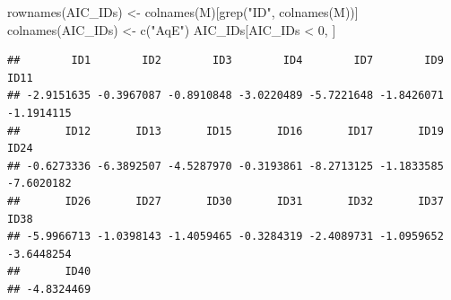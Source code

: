 \documentclass[
  ignorenonframetext,
]{beamer}
\newenvironment{Shaded}{\begin{snugshade}}{\end{snugshade}}
\newcommand{\DecValTok}[1]{\textcolor[rgb]{0.00,0.00,0.81}{#1}}
\newcommand{\FunctionTok}[1]{\textcolor[rgb]{0.00,0.00,0.00}{#1}}
\newcommand{\NormalTok}[1]{#1}
\newcommand{\OtherTok}[1]{\textcolor[rgb]{0.56,0.35,0.01}{#1}}
\newcommand{\SpecialCharTok}[1]{\textcolor[rgb]{0.00,0.00,0.00}{#1}}
\newcommand{\StringTok}[1]{\textcolor[rgb]{0.31,0.60,0.02}{#1}}
\begin{document}
\begin{frame}[fragile]{}
\protect\hypertarget{section-19}{}
\tiny

\begin{Shaded}
\begin{Highlighting}[]
\FunctionTok{rownames}\NormalTok{(AIC\_IDs) }\OtherTok{\textless{}{-}} \FunctionTok{colnames}\NormalTok{(M)[}\FunctionTok{grep}\NormalTok{(}\StringTok{"ID"}\NormalTok{, }\FunctionTok{colnames}\NormalTok{(M))]}
\FunctionTok{colnames}\NormalTok{(AIC\_IDs) }\OtherTok{\textless{}{-}} \FunctionTok{c}\NormalTok{(}\StringTok{"AqE"}\NormalTok{)}
\NormalTok{AIC\_IDs[AIC\_IDs }\SpecialCharTok{\textless{}} \DecValTok{0}\NormalTok{, ]}
\end{Highlighting}
\end{Shaded}

\begin{verbatim}
##        ID1        ID2        ID3        ID4        ID7        ID9       ID11 
## -2.9151635 -0.3967087 -0.8910848 -3.0220489 -5.7221648 -1.8426071 -1.1914115 
##       ID12       ID13       ID15       ID16       ID17       ID19       ID24 
## -0.6273336 -6.3892507 -4.5287970 -0.3193861 -8.2713125 -1.1833585 -7.6020182 
##       ID26       ID27       ID30       ID31       ID32       ID37       ID38 
## -5.9966713 -1.0398143 -1.4059465 -0.3284319 -2.4089731 -1.0959652 -3.6448254 
##       ID40 
## -4.8324469
\end{verbatim}
\end{frame}
\end{document}
